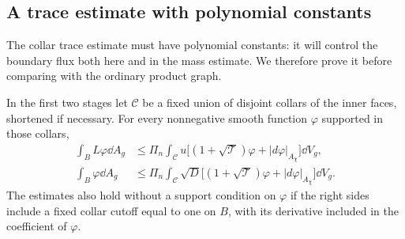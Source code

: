 \subsection{A trace estimate with polynomial constants}

The collar trace estimate must have polynomial constants: it will
control the boundary flux both here and in the mass estimate.
We therefore prove it before comparing with the ordinary product graph.

\begin{lemma}
\label{n3:apriori:trace}
In the first two stages let $\mathcal C$ be a fixed union of disjoint
collars of the inner faces, shortened if necessary.  For every
nonnegative smooth function $\varphi$ supported in those collars,
\begin{align}
 \int_B L\varphi\dd A_g
 &\le\Pi_n\int_{\mathcal C}u
       \bigl[(1+\sqrt{\mathcal T})\varphi
                          +|d\varphi|_{A_\chi}\bigr]\dd V_g,
 \label{n3:apriori:weighted-trace}\\
 \int_B\varphi\dd A_g
 &\le\Pi_n\int_{\mathcal C}\sqrt D
       \bigl[(1+\sqrt{\mathcal T})\varphi
                          +|d\varphi|_{A_\chi}\bigr]\dd V_g.
 \label{n3:apriori:unweighted-trace}
\end{align}
The estimates also hold without a support condition on $\varphi$
if the right sides include a fixed collar cutoff equal to one on
$B$, with its derivative included in the coefficient of $\varphi$.
\end{lemma}

